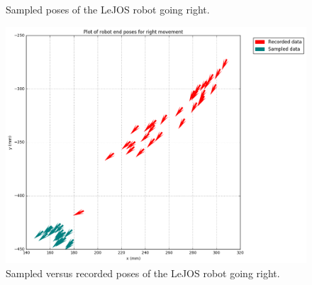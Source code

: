 \documentclass[paper=a4, fontsize=11pt]{scrartcl} %
\begin{document}
\begin{figure}[h!]
\begin{minipage}{0.5\textwidth}
            \caption{Sampled poses of the LeJOS robot going right.}
        \end{minipage}
    \end{figure}

    \begin{figure}[H]
        \centering
        \includegraphics[width=1\textwidth]{images/poses_compare_right.png}
        \caption{Sampled versus recorded poses of the LeJOS robot going right.}
    \end{figure}
\end{document}
